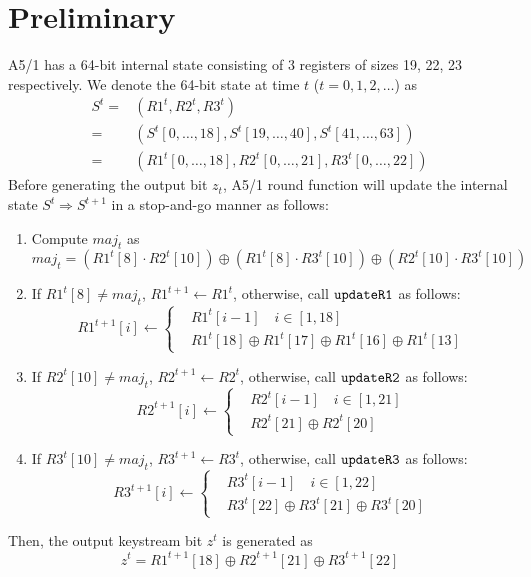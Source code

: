 \section{Preliminary}
A5/1 has a 64-bit internal state consisting of 3 registers of sizes 19, 22, 23 respectively.
We denote the 64-bit state at time $t$ ($t=0,1,2,\ldots$) as
\begin{equation}\label{eq:StateAndRi}
\begin{split}
   S^t= & (R1^t, R2^t, R3^t)\\
     =& (S^t[0,\ldots, 18],S^t[19,\ldots, 40],S^t[41,\ldots, 63])\\
     =&(R1^t[0,\ldots,18],R2^t[0,\ldots, 21],R3^t[0,\ldots,22])
\end{split}
\end{equation}
Before generating the output bit $z_t$, A5/1 round function will update the internal state $S^t\Rightarrow S^{t+1}$ in a stop-and-go manner as follows:
\begin{enumerate}
  \item Compute $maj_t$ as
\begin{equation}\label{eq:Majt}
  maj_t=(R1^t[8]\cdot R2^t[10])\oplus (R1^t[8]\cdot R3^t[10])\oplus (R2^t[10]\cdot R3^t[10])
\end{equation}
  \item If $R1^t[8]\neq maj_t$, $R1^{t+1}\leftarrow R1^t$, otherwise, call $\tt{updateR1}$ as follows:
  \begin{equation}\label{eq:UpdateR1}
    R1^{t+1}[i]\leftarrow\left\{
    \begin{aligned}
      &R1^t[i-1]\quad i\in [1,18]\\
      &R1^t[18]\oplus R1^t[17]\oplus R1^t[16]\oplus R1^t[13]
    \end{aligned}
    \right.
  \end{equation}
  \item If $R2^t[10]\neq maj_t$, $R2^{t+1}\leftarrow R2^t$, otherwise, call $\tt{updateR2}$ as follows:
    \begin{equation}\label{eq:UpdateR2}
    R2^{t+1}[i]\leftarrow\left\{
    \begin{aligned}
      &R2^t[i-1]\quad i\in [1,21]\\
      &R2^t[21]\oplus R2^t[20]
    \end{aligned}
    \right.
  \end{equation}
    \item If $R3^t[10]\neq maj_t$, $R3^{t+1}\leftarrow R3^t$, otherwise, call $\tt{updateR3}$ as follows:
    \begin{equation}\label{eq:UpdateR3}
    R3^{t+1}[i]\leftarrow\left\{
    \begin{aligned}
      &R3^t[i-1]\quad i\in [1,22]\\
      &R3^t[22]\oplus R3^t[21]\oplus R3^t[20]
    \end{aligned}
    \right.
  \end{equation}
\end{enumerate}
Then, the output keystream bit $z^t$ is generated as
\begin{equation}\label{eq:OutputZ}
  z^t=R1^{t+1}[18]\oplus R2^{t+1}[21]\oplus R3^{t+1}[22]
\end{equation}
